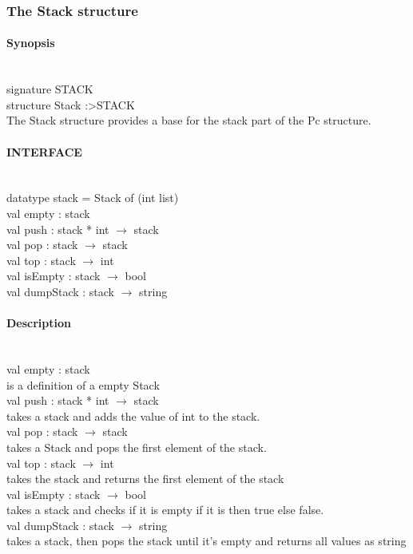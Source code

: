 \documentclass{article}
\begin{document}
\subsubsection{The Stack structure}
\paragraph{Synopsis}\
\\
signature STACK \\
structure Stack :\textgreater STACK
\\
The Stack structure provides a base for the stack part of the Pc structure.

\paragraph{INTERFACE}\
\\
	datatype stack = Stack of (int list)\\
	val empty : stack \\
	val push : stack * int $\rightarrow$ stack\\
	val pop : stack $\rightarrow$ stack\\
	val top : stack $\rightarrow$ int\\
	val isEmpty : stack $\rightarrow$ bool \\
	val dumpStack : stack $\rightarrow$ string\\

\paragraph{Description}\
\\
	val empty : stack\\
		is a definition of a empty Stack
\\
	val push : stack * int $\rightarrow$ stack\\
		takes a stack and adds the value of int to the stack.
\\
	val pop : stack $\rightarrow$ stack	\\
		takes a Stack and pops the first element of the stack.
\\
	val top : stack $\rightarrow$ int\\
		takes the stack and returns the first element of the stack
\\
	val isEmpty : stack $\rightarrow$ bool\\
		takes a stack and checks if it is empty if it is then true else false.
\\
	val dumpStack : stack $\rightarrow$ string\\
		takes a stack, then pops the stack until it's empty and returns all values as string
\end{document}
